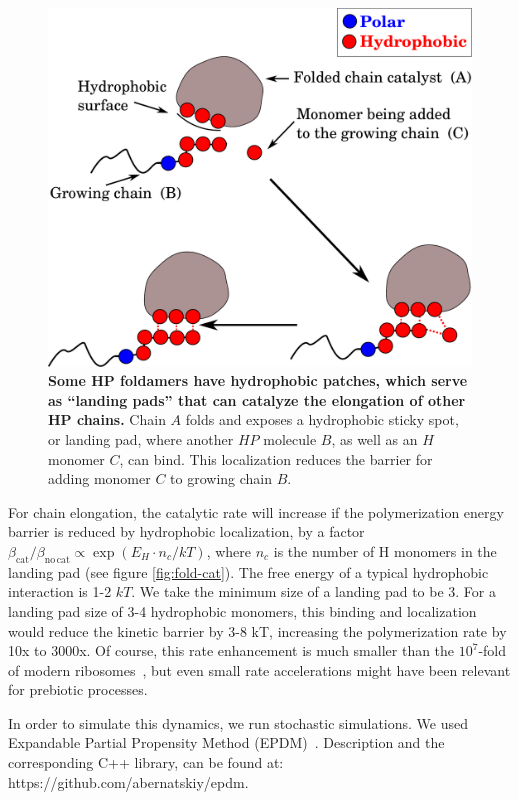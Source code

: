 \documentclass[twocolumn,letterpaper]{revtex4}
\begin{document}
   \begin{figure}[ht!]
  \centering
  \includegraphics[width=0.8\columnwidth]{pictures/hp-catalysis.pdf} 
  \caption{\footnotesize{\textbf{Some HP foldamers have hydrophobic patches, which serve as 
``landing pads'' that can catalyze the elongation of other HP chains.}  Chain $A$ folds and 
exposes a hydrophobic sticky spot, or landing pad, where another $HP$ molecule $B$, as well as an 
$H$ monomer 
$C$, can bind.  This localization reduces the barrier for adding monomer $C$ to growing chain 
$B$.}}
  \label{fig:hp-catalysis}
\end{figure} 

 For chain elongation, the catalytic rate will increase if the polymerization energy barrier is 
reduced by hydrophobic localization, by a factor $\beta_\mathrm{cat}/ \beta_\mathrm{no\,cat} 
\propto \exp(E_{H}\cdot n_{c}/kT)$, where $n_c$ is the number of H monomers in the landing pad (see 
figure \ref{fig:fold-cat}).  The free energy of a typical hydrophobic interaction 
is 1-2 $kT$.  We take the minimum size of a landing pad to be 3.  For a landing pad size of 3-4 
hydrophobic monomers, this binding and localization would reduce the kinetic barrier by 3-8 kT, 
increasing the polymerization rate by 10x to 3000x.  Of course, this rate enhancement is much 
smaller than the $10^7$-fold of modern ribosomes~\cite{Sievers2004a}, but even small rate 
accelerations might have been relevant for prebiotic processes.

In order to simulate this dynamics, we run stochastic simulations. 
We used Expandable Partial Propensity Method (EPDM)~\cite{Guseva2016b}. Description and the 
corresponding C++ library, can be found at: 
https://github.com/abernatskiy/epdm. 
  
\end{document}
